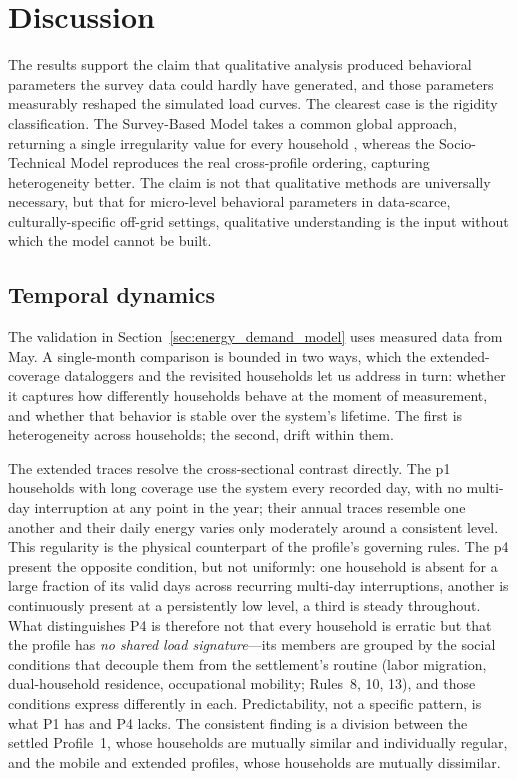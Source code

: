 \documentclass[final,3p,times,onecolumn]{elsarticle}
\begin{document}
\section{Discussion}
\label{sec:discussion}

The results support the claim that qualitative analysis produced behavioral parameters the survey data could hardly have generated, and those parameters measurably reshaped the simulated load curves. The clearest case is the rigidity classification. The Survey-Based Model takes a common global approach, returning a single irregularity value for every household , whereas the Socio-Technical Model reproduces the real cross-profile ordering, capturing heterogeneity better. The claim is not that qualitative methods are universally necessary, but that for micro-level behavioral parameters in data-scarce, culturally-specific off-grid settings, qualitative understanding is the input without which the model cannot be built.

\subsection{Temporal dynamics}
\label{sec:temporal_dynamics}

The validation in Section~\ref{sec:energy_demand_model} uses measured data from May. A single-month comparison is bounded in two ways, which the extended-coverage dataloggers and the revisited households let us address in turn: whether it captures how differently households behave at the moment of measurement, and whether that behavior is stable over the system's lifetime. The first is heterogeneity across households; the second, drift within them.

The extended traces resolve the cross-sectional contrast directly. The \gls{p1} households with long coverage use the system every recorded day, with no multi-day interruption at any point in the year; their annual traces resemble one another and their daily energy varies only moderately around a consistent level. This regularity is the physical counterpart of the profile's governing rules. The \gls{p4} present the opposite condition, but not uniformly: one household is absent for a large fraction of its valid days across recurring multi-day interruptions, another is continuously present at a persistently low level, a third is steady throughout. What distinguishes P4 is therefore not that every household is erratic but that the profile has \emph{no shared load signature}---its members are grouped by the social conditions that decouple them from the settlement's routine (labor migration, dual-household residence, occupational mobility; Rules~8, 10, 13), and those conditions express differently in each. Predictability, not a specific pattern, is what P1 has and P4 lacks. The consistent finding is a division between the settled Profile~1, whose households are mutually similar and individually regular, and the mobile and extended profiles, whose households are mutually dissimilar.
\end{document}
